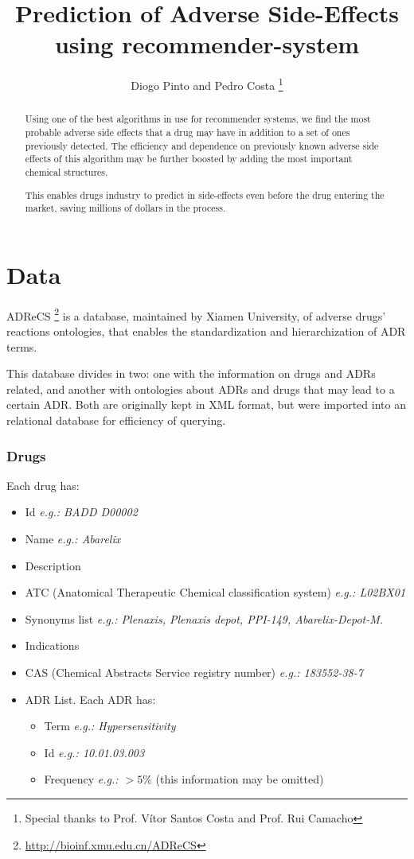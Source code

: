 \documentclass{llncs}
\begin{document}
\title{Prediction of Adverse Side-Effects using recommender-system}
\author{Diogo Pinto and Pedro Costa
\thanks{Special thanks to Prof. Vítor Santos Costa and Prof. Rui Camacho}}

\maketitle


\begin{abstract}
Using one of the best algorithms in use for recommender systems, we find the most probable adverse side effects that a drug may have in addition to a set of ones previously detected. The efficiency and dependence on previously known adverse side effects of this algorithm may be further boosted by adding the most important chemical structures. 

This enables drugs industry to predict in side-effects even before the drug entering the market, saving millions of dollars in the process.
\end{abstract}

\section{Data}
ADReCS
\footnote{\url{http://bioinf.xmu.edu.cn/ADReCS}}
is a database, maintained by Xiamen University, of adverse drugs' reactions ontologies, that enables the standardization and hierarchization of ADR terms.

This database divides in two: one with the information on drugs and ADRs related, and another with ontologies about ADRs and drugs that may lead to a certain ADR. Both are originally kept in XML format, but were imported into an relational database for efficiency of querying.

\subsubsection{Drugs}

Each drug has:
\begin{itemize}
\item Id \textit{e.g.: BADD D00002}
\item Name \textit{e.g.: Abarelix}
\item Description
\item ATC (Anatomical Therapeutic Chemical classification system) \textit{e.g.: L02BX01}
\item Synonyms list \emph{e.g.: Plenaxis, Plenaxis depot, PPI-149, Abarelix-Depot-M.}
\item Indications
\item CAS (Chemical Abstracts Service registry number) \emph{e.g.: 183552-38-7}
\item ADR List. Each ADR has:
	\begin{itemize}
	\item Term \textit{e.g.: Hypersensitivity}
	\item Id \textit{e.g.: 10.01.03.003}
	\item Frequency \textit{e.g.: $>5\%$} (this information may be omitted)
	\end{itemize}
\end{itemize}
\end{document}

